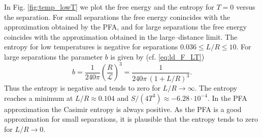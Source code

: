 In Fig. \ref{fig:temp_lowT} we plot the free energy and the entropy for $T=0$
versus the separation. For small separations the free energy conincides with
the approximation obtained by the PFA, and for large separations the free energy
coincides with the approximation obtained in the large--distance limit. The
entropy for low temperatures is negative for separations $0.036 \le L/R \le
10$. For large separations the parameter $b$ is given by (cf. \eqref{eq:ld_F_LT})
\begin{equation}
b = \frac{1}{240\pi} \left(\frac{R}{\mathcal{L}}\right)^3 = \frac{1}{240\pi \, (1+L/R)^3}.
\end{equation}
Thus the entropy is negative and tends to zero for $L/R\to\infty$. The entropy
reaches a minimum at $L/R \approx 0.104$ and $S/(4T^3) \approx
-6.28\cdot10^{-4}$. In the PFA approximation the Casimir entropy is always
positive. As the PFA is a good approximation for small separations, it is
plausible that the entropy tends to zero for $L/R\to0$.

